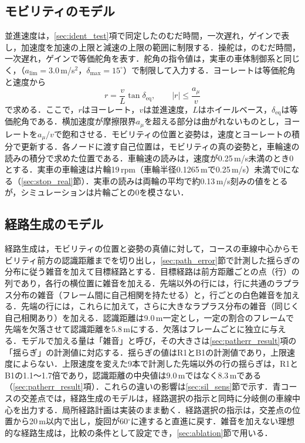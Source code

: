 \subsection{モビリティのモデル}
\label{sec:sil_vehicle}
並進速度は，\ref{sec:ident_test}項で同定したのむだ時間，一次遅れ，ゲインで表し，加速度を加速の上限と減速の上限の範囲に制限する．操舵は，のむだ時間，一次遅れ，ゲインで等価舵角を表す．舵角の指令値は，実車の車体制御系と同じく，（$a_{\mathrm{lim}}=3.0$\,m/s$^2$，$\delta_{\max}=15^\circ$）で制限して入力する．ヨーレートは等価舵角と速度から
\begin{equation}
  r = \frac{v}{L}\tan\delta_{\mathrm{eq}},\qquad |r| \le \frac{a_\mu}{v}
  \label{eq:yawrate}
\end{equation}
で求める．ここで，$r$はヨーレート，$v$は並進速度，$L$はホイールベース，$\delta_{\mathrm{eq}}$は等価舵角である．横加速度が摩擦限界$a_\mu$を超える部分は曲がれないものとし，ヨーレートを$a_\mu/v$で飽和させる．モビリティの位置と姿勢は，速度とヨーレートの積分で更新する．各ノードに渡す自己位置は，モビリティの真の姿勢と，車輪速の読みの積分で求めた位置である．車輪速の読みは，速度が0.25\,m/s未満のとき0とする．実車の車輪速は片輪19\,rpm（車輪半径0.1265\,mで0.25\,m/s）未満で0になる（\ref{sec:stop_real}節）．実車の読みは両輪の平均で約0.13\,m/s刻みの値をとるが，シミュレーションは片輪ごとの0を模さない．

\subsection{経路生成のモデル}
\label{sec:sil_path}
経路生成は，モビリティの位置と姿勢の真値に対して，コースの車線中心からモビリティ前方の認識距離までを切り出し，\ref{sec:path_error}節で計測した揺らぎの分布に従う雑音を加えて目標経路とする．目標経路は前方距離ごとの点（行）の列であり，各行の横位置に雑音を加える．先端以外の行には，行に共通のラプラス分布の雑音（フレーム間に自己相関を持たせる）と，行ごとの白色雑音を加える．先端の行には，これらに加えて，さらに大きなラプラス分布の雑音（同じく自己相関あり）を加える．認識距離は9.0\,m一定とし，一定の割合のフレームで先端を欠落させて認識距離を5.8\,mにする．欠落はフレームごとに独立に与える．モデルで加える量は「雑音」と呼び，その大きさは\ref{sec:patherr_result}項の「揺らぎ」の計測値に対応する．揺らぎの値はR1とB1の計測値であり，上限速度によらない．上限速度を変えた9本で計測した先端以外の行の揺らぎは，R1とB1の1.1〜1.7倍であり，認識距離の中央値は9.0\,mではなく8.3\,mである（\ref{sec:patherr_result}項）．これらの違いの影響は\ref{sec:sil_sens}節で示す．青コースの交差点では，経路生成のモデルは，経路選択の指示と同時に分岐側の車線中心を出力する．局所経路計画は実装のまま動く．経路選択の指示は，交差点の位置から20\,m以内で出し，旋回が60$^\circ$に達すると直進に戻す．雑音を加えない理想的な経路生成は，比較の条件として設定でき，\ref{sec:ablation}節で用いる．

